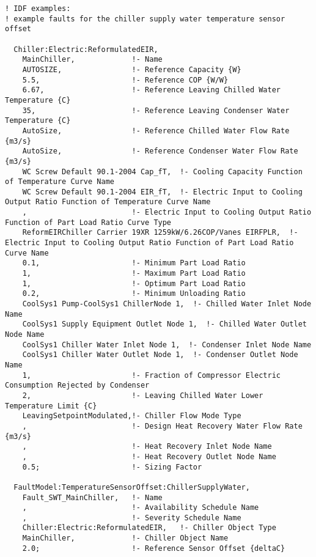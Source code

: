 \begin{lstlisting}
! IDF examples:
! example faults for the chiller supply water temperature sensor offset

  Chiller:Electric:ReformulatedEIR,
    MainChiller,             !- Name
    AUTOSIZE,                !- Reference Capacity {W}
    5.5,                     !- Reference COP {W/W}
    6.67,                    !- Reference Leaving Chilled Water Temperature {C}
    35,                      !- Reference Leaving Condenser Water Temperature {C}
    AutoSize,                !- Reference Chilled Water Flow Rate {m3/s}
    AutoSize,                !- Reference Condenser Water Flow Rate {m3/s}
    WC Screw Default 90.1-2004 Cap_fT,  !- Cooling Capacity Function of Temperature Curve Name
    WC Screw Default 90.1-2004 EIR_fT,  !- Electric Input to Cooling Output Ratio Function of Temperature Curve Name
    ,                        !- Electric Input to Cooling Output Ratio Function of Part Load Ratio Curve Type
    ReformEIRChiller Carrier 19XR 1259kW/6.26COP/Vanes EIRFPLR,  !- Electric Input to Cooling Output Ratio Function of Part Load Ratio Curve Name
    0.1,                     !- Minimum Part Load Ratio
    1,                       !- Maximum Part Load Ratio
    1,                       !- Optimum Part Load Ratio
    0.2,                     !- Minimum Unloading Ratio
    CoolSys1 Pump-CoolSys1 ChillerNode 1,  !- Chilled Water Inlet Node Name
    CoolSys1 Supply Equipment Outlet Node 1,  !- Chilled Water Outlet Node Name
    CoolSys1 Chiller Water Inlet Node 1,  !- Condenser Inlet Node Name
    CoolSys1 Chiller Water Outlet Node 1,  !- Condenser Outlet Node Name
    1,                       !- Fraction of Compressor Electric Consumption Rejected by Condenser
    2,                       !- Leaving Chilled Water Lower Temperature Limit {C}
    LeavingSetpointModulated,!- Chiller Flow Mode Type
    ,                        !- Design Heat Recovery Water Flow Rate {m3/s}
    ,                        !- Heat Recovery Inlet Node Name
    ,                        !- Heat Recovery Outlet Node Name
    0.5;                     !- Sizing Factor

  FaultModel:TemperatureSensorOffset:ChillerSupplyWater,
    Fault_SWT_MainChiller,   !- Name
    ,                        !- Availability Schedule Name
    ,                        !- Severity Schedule Name
    Chiller:Electric:ReformulatedEIR,   !- Chiller Object Type
    MainChiller,             !- Chiller Object Name
    2.0;                     !- Reference Sensor Offset {deltaC}

\end{lstlisting}


